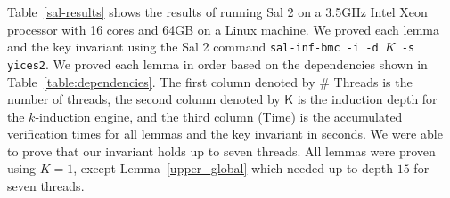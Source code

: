 Table~\ref{sal-results} shows the results of running Sal 2 on a 3.5GHz
Intel Xeon processor with 16 cores and 64GB on a Linux machine. We
proved each lemma and the key invariant using the Sal 2 command
\texttt{sal-inf-bmc -i -d $K$ -s yices2}. We proved each lemma in
order based on the dependencies shown in
Table~\ref{table:dependencies}.
%
The first column denoted by \textsf{\# Threads} is the number of
threads, the second column denoted by $\mathsf{K}$ is the induction
depth for the $k$-induction engine, and the third column
(\textsf{Time}) is the accumulated verification times for all lemmas
and the key invariant in seconds.
%
We were able to prove that our invariant holds up to seven
threads. All lemmas were proven using $K=1$, except
Lemma~\ref{upper_global} which needed up to depth $15$ for seven
threads.


